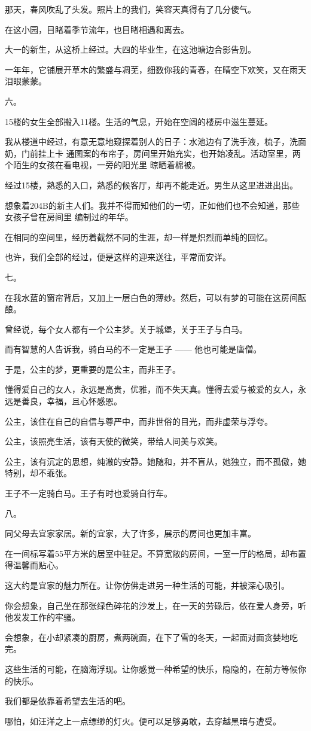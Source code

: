 \documentclass[12pt,a4paper]{article}
\newcommand{\subpart}[1]{
	\begingroup \par
	\vspace{1ex} \centering #1
	\par \endgroup \nopagebreak[4]
}
\begin{document}
		那天，春风吹乱了头发。照片上的我们，笑容天真得有了几分傻气。\par
		在这小园，目睹着季节流年，也目睹相遇和离去。\par
		大一的新生，从这桥上经过。大四的毕业生，在这池塘边合影告别。\par
		一年年，它铺展开草木的繁盛与凋芜，细数你我的青春，在晴空下欢笑，又在雨天泪眼蒙蒙。

		\subpart{六。}

		15楼的女生全部搬入11楼。生活的气息，开始在空阔的楼房中滋生蔓延。

		我从楼道中经过，有意无意地窥探着别人的日子：水池边有了洗手液，梳子，洗面奶，门前挂上卡
	通图案的布帘子，房间里开始充实，也开始凌乱。活动室里，两个陌生的女孩在看电视，一旁的阳光里
	晾晒着棉被。

		经过15楼，熟悉的入口，熟悉的候客厅，却再不能走近。男生从这里进进出出。

		想象着204B的新主人们。我并不得而知他们的一切，正如他们也不会知道，那些女孩子曾在房间里
	编制过的年华。

		在相同的空间里，经历着截然不同的生涯，却一样是炽烈而单纯的回忆。

		也许，我们全部的经过，便是这样的迎来送往，平常而安详。

		\subpart{七。}

		在我水蓝的窗帘背后，又加上一层白色的薄纱。然后，可以有梦的可能在这房间酝酿。\par
		曾经说，每个女人都有一个公主梦。关于城堡，关于王子与白马。\par
		而有智慧的人告诉我，骑白马的不一定是王子 —— 他也可能是唐僧。\par
		于是，公主的梦，更重要的是公主，而非王子。\par
		懂得爱自己的女人，永远是高贵，优雅，而不失天真。懂得去爱与被爱的女人，永远是善良，幸福，且心怀感恩。\par
		公主，该住在自己的自信与尊严中，而非世俗的目光，而非虚荣与浮夸。\par
		公主，该照亮生活，该有天使的微笑，带给人间美与欢笑。\par
		公主，该有沉定的思想，纯澈的安静。她随和，并不盲从，她独立，而不孤傲，她特别，却不乖张。\par
		王子不一定骑白马。王子有时也爱骑自行车。

		\subpart{八。}

		同父母去宜家家居。新的宜家，大了许多，展示的房间也更加丰富。\par
		在一间标写着55平方米的居室中驻足。不算宽敞的房间，一室一厅的格局，却布置得温馨而贴心。\par
		这大约是宜家的魅力所在。让你仿佛走进另一种生活的可能，并被深心吸引。\par
		你会想象，自己坐在那张绿色碎花的沙发上，在一天的劳碌后，依在爱人身旁，听他发发工作的牢骚。\par
		会想象，在小却紧凑的厨房，煮两碗面，在下了雪的冬天，一起面对面贪婪地吃完。\par
		这些生活的可能，在脑海浮现。让你感觉一种希望的快乐，隐隐的，在前方等候你的快乐。\par
		我们都是依靠着希望去生活的吧。\par
		哪怕，如汪洋之上一点缥缈的灯火。便可以足够勇敢，去穿越黑暗与遭受。
\end{document}
